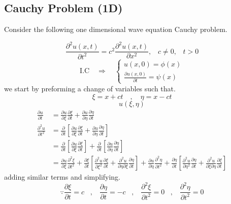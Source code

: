 \documentclass[]{article}
\begin{document}
\subsection{Cauchy Problem (1D)}
Consider the following one dimensional wave equation Cauchy problem.

\begin{equation}
\frac{\partial^2 u\left(x,t \right)}{\partial t^2} = c^2\frac{\partial^2 u\left(x,t \right)}{\partial x^2},\;\;\; c\neq 0,\;\;\; t>0
\end{equation}
\begin{equation}
    \text{I.C} \quad \Longrightarrow \quad 
    \begin{cases}
    u\left(x,0 \right) = \phi\left(x\right)
    \\
    \frac{\partial u\left(x,0 \right)}{\partial t} = \psi\left(x\right)
    \end{cases}
\end{equation}
we start by preforming a change of variables such that.
\[
    \xi = x+ct \quad , \quad \eta = x-ct    
\]
\[
    u\left(\xi , \eta \right)    
\]
\begin{align*}
\frac{\partial u}{\partial t} &= \frac{\partial u}{\partial \xi}\frac{\partial \xi}{\partial t} + \frac{\partial u}{\partial \eta} \frac{\partial \eta}{\partial t}
\\
\frac{\partial^2 u}{\partial t^2} &= \frac{\partial}{\partial t}\left[ \frac{\partial u}{\partial \xi}\frac{\partial \xi}{\partial t} + \frac{\partial u}{\partial \eta} \frac{\partial \eta}{\partial t}\right]
\\
&= \frac{\partial}{\partial t}\left[ \frac{\partial u}{\partial \xi}\frac{\partial \xi}{\partial t}\right] + \frac{\partial}{\partial t}\left[\frac{\partial u}{\partial \eta} \frac{\partial \eta}{\partial t}\right]
\\
&= \frac{\partial u}{\partial \xi}\frac{\partial^2 \xi}{\partial t^2} + \frac{\partial \xi}{\partial t}\left[\frac{\partial^2 u}{\partial \xi^2}\frac{\partial \xi}{\partial t} + \frac{\partial^2 u}{\partial\eta \partial\xi}\frac{\partial \eta}{\partial t} \right]+\frac{\partial u}{\partial \eta}\frac{\partial^2 \eta}{\partial t^2}+\frac{\partial \eta}{\partial t}\left[\frac{\partial^2 u}{\partial \eta^2}\frac{\partial \eta}{\partial t}+\frac{\partial^2 u}{\partial\xi\partial\eta}\frac{\partial\xi}{\partial t}\right]
\end{align*}
adding similar terms and simplifying.
\[
\because \frac{\partial\xi}{\partial t}=c\;\;\;,\;\;\;\frac{\partial\eta}{\partial t}=-c\;\;\;,\;\;\;\frac{\partial^2\xi}{\partial t^2}=0\;\;\;,\;\;\;\frac{\partial^2\eta}{\partial t^2}=0    
\]
\end{document}
